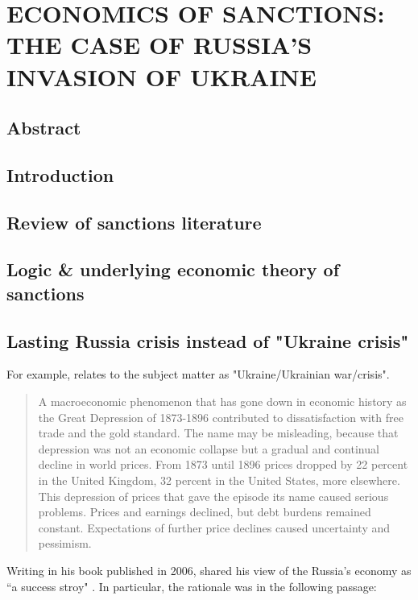 \newpage

\section{\MakeUppercase{Economics of Sanctions: The Case of Russia's Invasion of Ukraine}}\label{sec:sanctions}

\subsection*{Abstract}
\subsection{Introduction}
\subsection{Review of sanctions literature}
\subsection{Logic \& underlying economic theory of sanctions}

\subsection{Lasting Russia crisis instead of "Ukraine crisis"}

For example, \citep{prates2023} relates to the subject matter as "Ukraine/Ukrainian war/crisis".

\begin{quote}
A macroeconomic phenomenon that has gone down in economic history as the Great Depression of 1873-1896 contributed to dissatisfaction with free trade and the gold standard. The name may be misleading, because that depression was not an economic collapse but a gradual and continual decline in world prices. From 1873 until 1896 prices dropped by 22 percent in the United Kingdom, 32 percent in the United States, more elsewhere. This depression of prices that gave the episode its name caused serious problems. Prices and earnings declined, but debt burdens remained constant. Expectations of further price declines caused uncertainty and pessimism. \citep[p.~8]{freiden2006}
\end{quote}

Writing in his book published in 2006, \citeauthor{gardiner2006} shared his view of the Russia's economy as ``a success stroy" \citeyearpar[p.~233]{gardiner2006}. In particular, the rationale was in the following passage:

